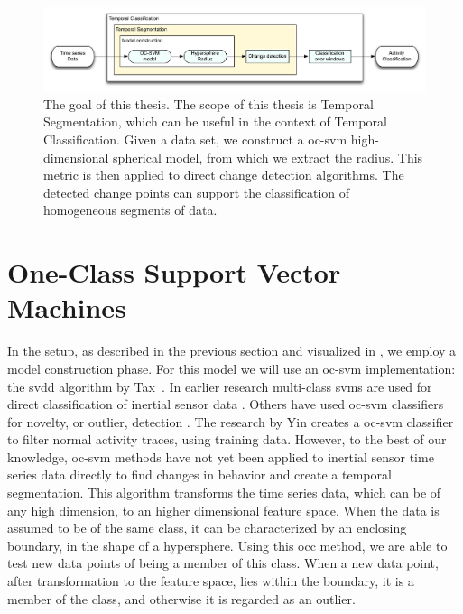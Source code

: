 \begin{figure}
  \centering
    \includegraphics[width=\textwidth,height=\textheight,keepaspectratio]{./Figures/chapter1/thesis_goal.pdf}
  \caption[Thesis goal]{The goal of this thesis. The scope of this thesis is Temporal Segmentation, which can be useful in the context of Temporal Classification. Given a data set, we construct a \gls{oc-svm} high-dimensional spherical model, from which we extract the radius. This metric is then applied to direct change detection algorithms. The detected change points can support the classification of homogeneous segments of data.}
  \label{fig:thesis_goal}
\end{figure}

\section{One-Class Support Vector Machines}
In the setup, as described in the previous section and visualized in , we employ a model construction phase.
For this model we will use an \acrlong{oc-svm} implementation: the \acrlong{svdd} algorithm by Tax~\cite{tax2001one}.
In earlier research multi-class \glspl{svm} are used for direct classification of inertial sensor data \cite{he2008activity,mountrakis2011support,anguita2012human}.
Others have used \gls{oc-svm} classifiers for novelty, or outlier, detection \cite{scholkopf1999support,camci2010change,li2003improving,ma2003time,tax1999support}.
The research by Yin \etal  \cite{yin2008sensor} creates a \gls{oc-svm} classifier to filter normal activity traces, using training data.
However, to the best of our knowledge, \gls{oc-svm} methods have not yet been applied to inertial sensor time series data directly to find changes in behavior and create a temporal segmentation.
This algorithm transforms the time series data, which can be of any high dimension, to an higher dimensional feature space.
When the data is assumed to be of the same class, it can be characterized by an enclosing boundary, in the shape of a hypersphere.
Using this \gls{occ} method, we are able to test new data points of being a member of this class.
When a new data point, after transformation to the feature space, lies within the boundary, it is a member of the class, and otherwise it is regarded as an outlier.

